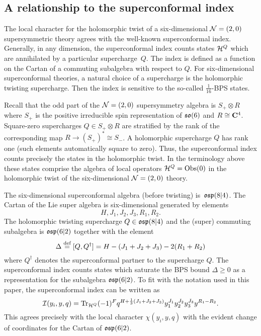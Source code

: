 \documentclass[../main.tex]{subfiles}
\begin{document}

\subsection{A relationship to the superconformal index}
\label{sec:sucaindex}
The local character for the holomorphic twist of a six-dimensional $\mathcal{N}=(2,0)$ supersymmetric theory agrees with the well-known superconformal index.
Generally, in any dimension, the superconformal index counts states $\mathcal{H}^Q$ which are annihilated by a particular supercharge~$Q$.
The index is defined as a function on the Cartan of a commuting subalgebra with respect to $Q$.
For six-dimensional superconformal theories, a natural choice of a supercharge is the holomorphic twisting supercharge. 
Then the index is sensitive to the so-called $\tfrac{1}{16}$-BPS states.

Recall that the odd part of the $\mathcal{N}=(2,0)$ supersymmetry algebra is $S_+ \otimes R$ where $S_+$ is the positive irreducible spin representation of $\mathfrak{so}(6)$ and $R \cong \mathbf{C}^4$.
Square-zero supercharges $Q \in S_+ \otimes R$ are stratified by the rank of the corresponding map $R \to (S_+)^* \cong S_-$.
A holomorphic supercharge $Q$ has rank one (such elements automatically square to zero). 
Thus, the superconformal index counts precisely the states in the holomorphic twist.
In the terminology above these states comprise the algebra of local operators $\mathcal{H}^Q = \text{Obs}(0)$ in the holomorphic twist of the six-dimensional $\mathcal{N}=(2,0)$ theory.

The six-dimensional superconformal algebra (before twisting) is~$\mathfrak{osp}(8|4)$.
The Cartan of the Lie super algebra is six-dimensional generated by elements
\[
H, J_1,J_2,J_3,R_1,R_2 .
\]
The holomorphic twisting supercharge $Q \in \mathfrak{osp}(8|4)$ and the (super) commuting subalgebra is $\mathfrak{osp}(6|2)$ together with the element 
\[
\Delta \overset{\text{def}}{=} [Q,Q^\dagger] = H - (J_1 + J_2 + J_3) - 2 (R_1 + R_2) 
\]
where $Q^\dagger$ denotes the superconformal partner to the supercharge $Q$. 
The superconformal index counts states which saturate the BPS bound $\Delta \geq 0$ as a representation for the subalgebra $\mathfrak{osp}(6|2)$. 
To fit with the notation used in this paper, the superconformal index can be written as
\begin{equation}
\mathcal{I}(y_i,y,q) = \text{Tr}_{\mathcal{H}^Q} (-1)^F q^{H + \frac13 (J_1+J_2+J_3)} y_1^{J_1} y_2^{J_2} y_3^{J_3} y^{R_1 - R_2} .
\end{equation}
This agrees precisely with the local character $\chi(y_i,y,q)$ with the evident change of coordinates for the Cartan of $\mathfrak{osp}(6|2)$. 
\end{document}
